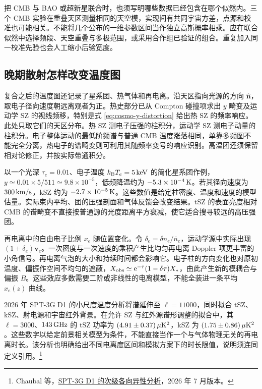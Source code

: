 把 CMB 与 BAO 或超新星联合时，也须写明哪些数据已经包含在哪个似然内。三个 CMB 实验在重叠天区测量相同的天空模，实现间有共同宇宙方差，点源和校准也可能相关。不能将几个公布的一维参数区间当作独立高斯概率相乘。应在联合似然中选择频段、天空重叠与多极范围，或采用合作组已验证的组合。重复加入同一校准先验也会人工缩小后验宽度。

\subsection{晚期散射怎样改变温度图}

复合之后的温度图还记录了星系团、热气体和再电离。沿天区指向光源的方向 $\hat{\bm n}$，取电子径向速度朝远离观者为正。热史部分已从 Compton 碰撞项求出 $y$ 畸变及运动学 SZ 的视线频移，特别是式 \eqref{eq:cosmo-y-distortion} 给出热 SZ 的频率响应。此处只取它们的天区分布。热 SZ 测电子压强的柱积分，运动学 SZ 测电子动量的柱积分。电子整体运动的最低阶频谱与普通 CMB 温度涨落相同，单靠多频图不能完全分离，热电子的谱畸变则可利用其随频率变号的响应识别。高温团还须保留相对论修正，并按实际带通积分。

以一个光深 $\tau_e=0.01$、电子温度 $k_{\rm B}T_e=5\,{\rm keV}$ 的简化星系团作例，$y\simeq0.01\times5/511\simeq9.8\times10^{-5}$，低频降温约为 $-5.3\times10^{-4}\,{\rm K}$。若其径向速度为 $300\,{\rm km/s}$，kSZ 约为 $-2.7\times10^{-5}\,{\rm K}$。这些数值是给定柱密度、温度和速度的模型估量。实际束内平均、团的压强剖面和气体反馈会改变结果。tSZ 的表面亮度相对 CMB 的谱畸变不直接按普通源的光度距离平方衰减，使它适合搜寻较远的高压强团。

再电离中的自由电子比例 $x_e$ 随位置变化。令 $\delta_e=\delta n_e/\bar n_e$，运动学源中实际出现 $(1+\delta_e)\bm v_e$。一次密度与一次速度的乘积产生比均匀再电离 Doppler 项更丰富的小角信号。再电离气泡的大小和持续时间都会影响它。电子柱的方向变化也对原初温度、偏振作空间不均匀的遮蔽，$X_{\rm obs}\simeq\mathrm{e}^{-\bar\tau}(1-\delta\tau)X_*$，由此产生新的模耦合与偏振 $B$。这些效应多数需要二阶或非线性的电离模型，不能全装进一条平均 $x_e(z)$ 曲线。

2026 年 SPT-3G D1 的小尺度温度分析将谱延伸至 $\ell=11000$，同时拟合 tSZ、kSZ、射电源和宇宙红外背景。在允许 SZ 与红外源谱形调整的拟合中，其 $\ell=3000$、$143\,{\rm GHz}$ 的 tSZ 功率为 $(4.91\pm0.37)\,\mu{\rm K}^2$，kSZ 为 $(1.75\pm0.86)\,\mu{\rm K}^2$。这些数字以给定前景相关模型为条件，不能直接当作一个与气体物理无关的再电离时长。该分析也明确给出不同电离度区间和模拟方案下的时长限值，说明须连同定义引用。\footnote{Chaubal 等，\href{https://arxiv.org/abs/2601.20551v2}{SPT-3G D1 的次级各向异性分析}，2026 年 7 月版本。}

